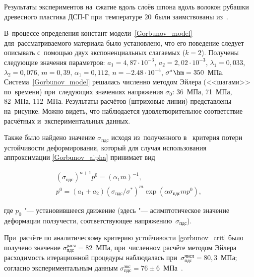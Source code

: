 \smallskip







 Результаты экспериментов на~сжатие вдоль слоёв шпона вдоль волокон рубашки древесного пластика ДСП-Г при~температуре \mbox{$20$\,\textcelsius} были заимствованы из~\cite{gorbunov:bib4}. 

В~процессе определения констант модели~\eqref{Gorbunov_model} для~рассматриваемого материала было установлено, что его поведение следует описывать с~помощью двух экспоненциальных слагаемых \mbox{($k=2$)}. Получены следующие значения параметров: \mbox{$a_1=4,87\cdot10^{-3}$}, \mbox{$a_2=2,02\cdot10^{-3}$}, \mbox{$\lambda_1=0,033$}, \mbox{$\lambda_2=0,076$}, \mbox{$m=0,39$}, \mbox{$\alpha_1=0,112$}, \mbox{$n=-2.48\cdot10^{-4}$}, $\sigma^*\hm=350$~МПа. Система~\eqref{Gorbunov_model} решалась численно методом Эйлера (<<шагами>> по~времени) при~следующих значениях напряжения $\sigma_0$: 36~МПа, 71~МПа, 82~МПа, 112~МПа. Результаты расчётов (штриховые линии) представлены на~рисунке. Можно видеть, что наблюдается удовлетворительное соответствие расчётных и~экспериментальных данных.



 Также было найдено значение $\sigma_{\text{пдс}}$ исходя из~полученного в~\cite{gorbunov:bib3} критерия потери устойчивости деформирования, который для случая использования аппроксимации \eqref{Gorbunov_alpha} принимает вид

%

\begin{equation}\label{gorbunov_crit}

\begin{array}{l}

(\sigma_{\text{пдс}})^{n+1} p^0 = ({\alpha_1 m})^{-1},\\

p^0=\left( a_1+a_2 \right) \left({\sigma_{\text{пдс}}}/{\sigma^*}\right)^{m} \exp({\alpha \sigma_{\text{пдс}} m p^0}),

\end{array}

\end{equation}

%

где $p_0$ "---  установившееся движение (здесь "--- асимптотическое значение деформации ползучести, соответствующее напряжению~$\sigma_{\text{пдс}}$).



При~расчёте по аналитическому критерию устойчивости \eqref{gorbunov_crit} было получено значение \mbox{$\sigma_{\text{пдс}}^{\text{расч}}=82$~МПа}, при~численном расчёте методом Эйлера расходимость итерационной процедуры наблюдалась при~\mbox{$\sigma_{\text{пдс}}^{\text{числ}}=80,3$~МПа}; согласно экспериментальным данным \mbox{$\sigma_{\text{пдс}}^{\text{экс}}=76\pm6$~МПа}~\cite{gorbunov:bib4}.



